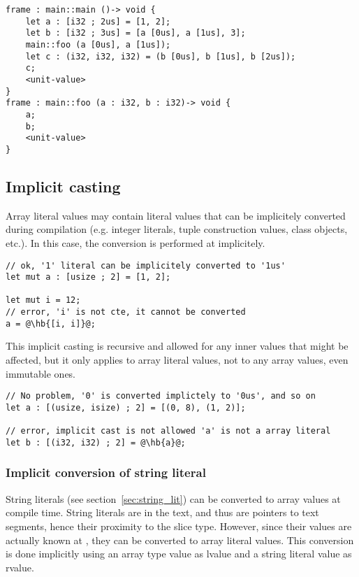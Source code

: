 \begin{lstlisting}[style=intermediateVerb]
frame : main::main ()-> void {
    let a : [i32 ; 2us] = [1, 2];
    let b : [i32 ; 3us] = [a [0us], a [1us], 3];
    main::foo (a [0us], a [1us]);
    let c : (i32, i32, i32) = (b [0us], b [1us], b [2us]);
    c;
    <unit-value>
}
frame : main::foo (a : i32, b : i32)-> void {
    a;
    b;
    <unit-value>
}
\end{lstlisting}


\subsection{Implicit casting}

Array literal values may contain literal values that can be implicitely
converted during compilation (e.g. integer literals, tuple construction values,
class objects, etc.). In this case, the conversion is performed at 
implicitely.

\begin{lstlisting}[style=coloredverbatim, escapechar=@]
// ok, '1' literal can be implicitely converted to '1us'
let mut a : [usize ; 2] = [1, 2];

let mut i = 12;
// error, 'i' is not cte, it cannot be converted
a = @\hb{[i, i]}@;
\end{lstlisting}

This implicit casting is recursive and allowed for any inner values that might
be affected, but it only applies to array literal values, not to any array
values, even immutable ones.

\begin{lstlisting}[style=coloredverbatim, escapechar=@]
// No problem, '0' is converted implictely to '0us', and so on
let a : [(usize, isize) ; 2] = [(0, 8), (1, 2)];

// error, implicit cast is not allowed 'a' is not a array literal
let b : [(i32, i32) ; 2] = @\hb{a}@;
\end{lstlisting}

\subsubsection{Implicit conversion of string literal}

String literals (see section~\ref{sec:string_lit}) can be converted to array
values at compile time. String literals are in the text, and thus are pointers to
text segments, hence their proximity to the slice type. However, since their
values are actually known at , they can be converted to array
literal values. This conversion is done implicitly using an array type value as
lvalue and a  string literal value as rvalue.

